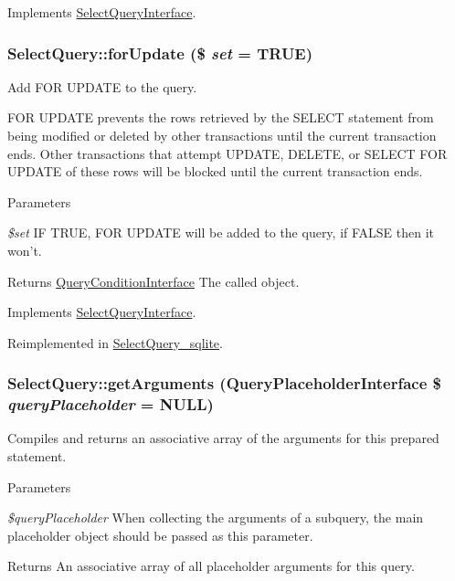 Implements \hyperlink{interfaceSelectQueryInterface_a7e5fcf83e82fe4f5b97d60bfccf2bb7f}{SelectQueryInterface}.\hypertarget{classSelectQuery_a44a1776379e738445712e196957e02b4}{
\subsubsection[{forUpdate}]{\setlength{\rightskip}{0pt plus 5cm}SelectQuery::forUpdate (\$ {\em set} = {\ttfamily TRUE})}}
\label{classSelectQuery_a44a1776379e738445712e196957e02b4}
Add FOR UPDATE to the query.

FOR UPDATE prevents the rows retrieved by the SELECT statement from being modified or deleted by other transactions until the current transaction ends. Other transactions that attempt UPDATE, DELETE, or SELECT FOR UPDATE of these rows will be blocked until the current transaction ends.


\begin{DoxyParams}{Parameters}
\item[{\em \$set}]IF TRUE, FOR UPDATE will be added to the query, if FALSE then it won't.\end{DoxyParams}
\begin{DoxyReturn}{Returns}
\hyperlink{interfaceQueryConditionInterface}{QueryConditionInterface} The called object. 
\end{DoxyReturn}


Implements \hyperlink{interfaceSelectQueryInterface_a723663b3105f06f28c75bd9d16b7a3c7}{SelectQueryInterface}.

Reimplemented in \hyperlink{classSelectQuery__sqlite_ad217a519ab7b84ce58b3e0e48b9bb943}{SelectQuery\_\-sqlite}.\hypertarget{classSelectQuery_a178ae347a7c736ac39fb5a25fb8b3783}{
\subsubsection[{getArguments}]{\setlength{\rightskip}{0pt plus 5cm}SelectQuery::getArguments ({\bf QueryPlaceholderInterface} \$ {\em queryPlaceholder} = {\ttfamily NULL})}}
\label{classSelectQuery_a178ae347a7c736ac39fb5a25fb8b3783}
Compiles and returns an associative array of the arguments for this prepared statement.


\begin{DoxyParams}{Parameters}
\item[{\em \$queryPlaceholder}]When collecting the arguments of a subquery, the main placeholder object should be passed as this parameter.\end{DoxyParams}
\begin{DoxyReturn}{Returns}
An associative array of all placeholder arguments for this query. 
\end{DoxyReturn}


